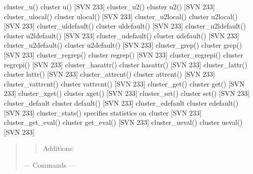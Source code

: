 \documentclass[letterpaper,10pt,english]{sphinxmanual}
\begin{document}
cluster\_u()             \sphinxhyphen{} cluster u() {[}SVN 233{]}
cluster\_u2()            \sphinxhyphen{} cluster u2() {[}SVN 233{]}
cluster\_ulocal()        \sphinxhyphen{} cluster ulocal() {[}SVN 233{]}
cluster\_u2local()       \sphinxhyphen{} cluster u2local() {[}SVN 233{]}
cluster\_uldefault()     \sphinxhyphen{} cluster uldefault() {[}SVN 233{]}
cluster\_u2ldefault()    \sphinxhyphen{} cluster u2ldefault() {[}SVN 233{]}
cluster\_udefault()      \sphinxhyphen{} cluster udefault() {[}SVN 233{]}
cluster\_u2default()     \sphinxhyphen{} cluster u2default() {[}SVN 233{]}
cluster\_grep()          \sphinxhyphen{} cluster grep() {[}SVN 233{]}
cluster\_regrep()        \sphinxhyphen{} cluster regrep() {[}SVN 233{]}
cluster\_regrepi()       \sphinxhyphen{} cluster regrepi() {[}SVN 233{]}
cluster\_hasattr()       \sphinxhyphen{} cluster hasattr() {[}SVN 233{]}
cluster\_lattr()         \sphinxhyphen{} cluster lattr() {[}SVN 233{]}
cluster\_attrcnt()       \sphinxhyphen{} cluster attrcnt() {[}SVN 233{]}
cluster\_vattrcnt()      \sphinxhyphen{} cluster vattrcnt() {[}SVN 233{]}
cluster\_get()           \sphinxhyphen{} cluster get() {[}SVN 233{]}
cluster\_xget()          \sphinxhyphen{} cluster xget() {[}SVN 233{]}
cluster\_set()           \sphinxhyphen{} cluster set() {[}SVN 233{]}
cluster\_default         \sphinxhyphen{} cluster default() {[}SVN 233{]}
cluster\_edefault        \sphinxhyphen{} cluster edefault() {[}SVN 233{]}
cluster\_stats()         \sphinxhyphen{} specifies statistics on cluster {[}SVN 233{]}
cluster\_get\_eval()      \sphinxhyphen{} cluster get\_eval() {[}SVN 233{]}
cluster\_ueval()         \sphinxhyphen{} cluster ueval() {[}SVN 233{]}
\begin{quote}
\begin{quote}

\sphinxAtStartPar
Additions:
\end{quote}

\sphinxAtStartPar
— Commands —
\end{quote}
\end{document}
